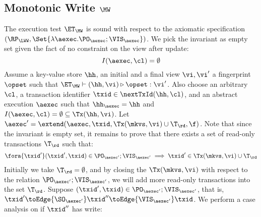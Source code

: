 \subsection{Monotonic Write \( \MW \)}
\label{sec:sound-complete-mw}

The execution test $\ET_\MW$ is sound with respect to the axiomatic specification 
$(\RP_{\LWW}, \Set{\lambda \aexec. \PO_{\aexec} ; \VIS_{\aexec} })$.
We pick the invariant as empty set given the fact of no constraint on the view after update:
\[ 
    I( \aexec, \cl ) = \emptyset 
\]
Assume a key-value store $\hh$, an initial and a final view $\vi, \vi'$  a fingerprint $\opset$ 
such that $\ET_{\MW} \vdash (\hh, \vi) \triangleright \opset: \vi'$. 
Also choose an arbitrary $\cl$, a transaction identifier $\txid \in \nextTxId(\hh, \cl)$, 
and an abstract execution $\aexec$ such that $\hh_{\aexec} = \hh$ and 
\( I(\aexec, \cl) =  \emptyset \subseteq \Tx(\hh, \vi) \).
Let \( \aexec' = \extend(\aexec, \txid, \Tx(\mkvs, \vi) \cup \T_\rd, \f ) \).
Note that since the invariant  is empty set, it remains to prove that there exists a set of read-only transactions \( \T_\rd \) such that:
\[
    \begin{array}{@{}l@{}}
        \fora{ \txid' }  (\txid' ,\txid)  \in \PO_{\aexec'} ; \VIS_{\aexec'}
        \implies \txid' \in \Tx(\mkvs, \vi) \cup \T_\rd
    \end{array}
\]
Initially we take \( \T_\rd = \emptyset \), 
and by closing the \( \Tx(\mkvs, \vi) \) with respect to the relation \( \PO_{\aexec'} ; \VIS_{\aexec'} \),
we will add more read-only transactions into the set \( \T_\rd\).
Suppose \( (\txid' ,\txid)  \in \PO_{\aexec'} ; \VIS_{\aexec'} \), 
that is, \( \txid' \toEdge{\SO_{\aexec'}} \txid'' \toEdge{\VIS_{\aexec'}} \txid \).
We perform a case analysis on if \( \txid'' \) has write:
